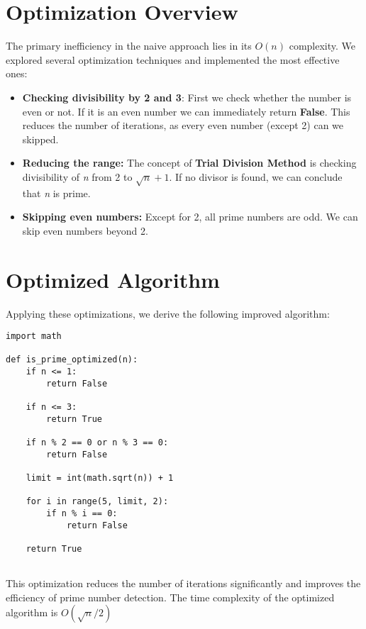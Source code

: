 \documentclass[a4paper,11pt]{article}
\begin{document}
\section{Optimization Overview}
The primary inefficiency in the naive approach lies in its \(O(n)\) complexity. We explored several optimization techniques and implemented the most effective ones:
\begin{itemize}
    \item \textbf{Checking divisibility by 2 and 3}: First we check whether the number is even or not. If it is an even number we can immediately return \textbf{False}. This reduces the number of iterations, as every even number (except 2) can we skipped.
    \item \textbf{Reducing the range:} The concept of \textbf{Trial Division Method} is checking divisibility of \textit{n} from 2 to \(\sqrt{n} + 1\). If no divisor is found, we can conclude that \textit{n} is prime.
    \item \textbf{Skipping even numbers:} Except for 2, all prime numbers are odd. We can skip even numbers beyond 2.
\end{itemize}

\section{Optimized Algorithm}
Applying these optimizations, we derive the following improved algorithm:

\begin{lstlisting}[caption={Optimized Prime Number Checking Algorithm}, label={code:optimized-prime-check}]
import math

def is_prime_optimized(n):
    if n <= 1:
        return False
        
    if n <= 3:
        return True
        
    if n % 2 == 0 or n % 3 == 0:
        return False
        
    limit = int(math.sqrt(n)) + 1
    
    for i in range(5, limit, 2):
        if n % i == 0:
            return False
    
    return True
    
\end{lstlisting}

This optimization reduces the number of iterations significantly and improves the efficiency of prime number detection. The time complexity of the optimized algorithm is \( O(\sqrt{n}/2) \)
\end{document}
